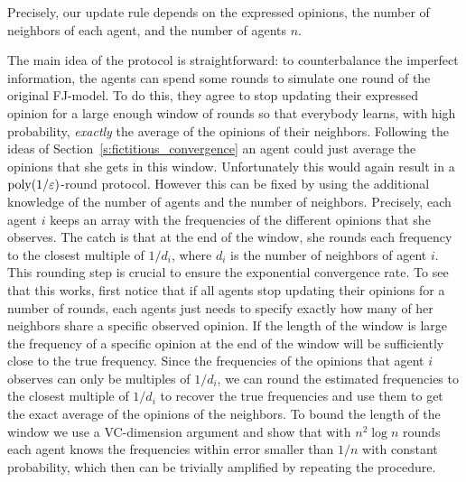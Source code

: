 Precisely, our update rule depends on the expressed opinions, the number of
neighbors of each agent, and the number of agents $n$.

The main idea of the protocol is straightforward: to counterbalance the
imperfect information, the agents can spend some rounds to simulate one round
of the original FJ-model. To do this, they agree to stop updating their
expressed opinion for a large enough window of rounds so that everybody learns,
with high probability, \emph{exactly} the average of the opinions of their
neighbors.  Following the ideas of Section~\ref{s:fictitious_convergence} an
agent could just average the opinions that she gets in this window.
Unfortunately this would again result in a $\mathrm{poly}(1/\varepsilon)$-round protocol.
However this can be fixed by using the additional knowledge of the number
of agents and the number of neighbors. Precisely, each agent
$i$ keeps an array with the frequencies of the different opinions that she
observes. The catch is that at the end of the window, she rounds each frequency
to the closest multiple of $1/d_i$, where $d_i$ is the number of neighbors of
agent $i$. This rounding step is crucial to ensure the exponential convergence
rate. To see that this works, first notice that if all agents stop updating
their opinions for a number of rounds, each agents just needs to specify
exactly how many of her neighbors share a specific observed opinion.
If the length of the window is large the frequency of
a specific opinion at the end of the window will be sufficiently
close to the true frequency.  Since the frequencies of
the opinions that agent $i$ observes can only be multiples of $1/d_i$,
we can round the estimated frequencies to the closest multiple of $1/d_i$ to
recover the true frequencies and use them to get the exact average of the
opinions of the neighbors.  To bound the length of the window we use a
VC-dimension argument and show that with $n^2 \log n$ rounds each agent
knows the frequencies within error smaller than $1/n$ with constant
probability, which then can be trivially amplified by repeating the procedure.

